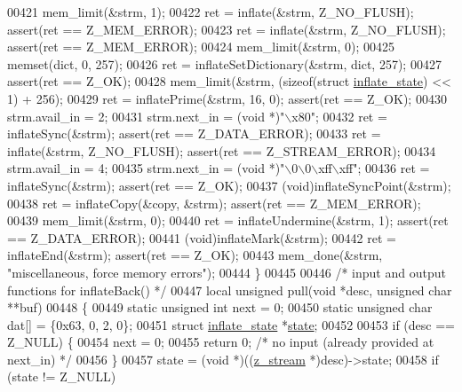 \begin{DoxyCode}
{{{{{00421     mem\_limit(&strm, 1);
00422     ret = inflate(&strm, Z\_NO\_FLUSH);           assert(ret == Z\_MEM\_ERROR);
00423     ret = inflate(&strm, Z\_NO\_FLUSH);           assert(ret == Z\_MEM\_ERROR);
00424     mem\_limit(&strm, 0);
00425     memset(dict, 0, 257);
00426     ret = inflateSetDictionary(&strm, dict, 257);
00427                                                 assert(ret == Z\_OK);
00428     mem\_limit(&strm, (\textcolor{keyword}{sizeof}(\textcolor{keyword}{struct} \hyperlink{structinflate__state}{inflate\_state}) << 1) + 256);
00429     ret = inflatePrime(&strm, 16, 0);           assert(ret == Z\_OK);
00430     strm.avail\_in = 2;
00431     strm.next\_in = (\textcolor{keywordtype}{void} *)\textcolor{stringliteral}{"\(\backslash\)x80"};
00432     ret = inflateSync(&strm);                   assert(ret == Z\_DATA\_ERROR);
00433     ret = inflate(&strm, Z\_NO\_FLUSH);           assert(ret == Z\_STREAM\_ERROR);
00434     strm.avail\_in = 4;
00435     strm.next\_in = (\textcolor{keywordtype}{void} *)\textcolor{stringliteral}{"\(\backslash\)0\(\backslash\)0\(\backslash\)xff\(\backslash\)xff"};
00436     ret = inflateSync(&strm);                   assert(ret == Z\_OK);
00437     (void)inflateSyncPoint(&strm);
00438     ret = inflateCopy(&copy, &strm);            assert(ret == Z\_MEM\_ERROR);
00439     mem\_limit(&strm, 0);
00440     ret = inflateUndermine(&strm, 1);           assert(ret == Z\_DATA\_ERROR);
00441     (void)inflateMark(&strm);
00442     ret = inflateEnd(&strm);                    assert(ret == Z\_OK);
00443     mem\_done(&strm, \textcolor{stringliteral}{"miscellaneous, force memory errors"});
00444 \}
00445 
00446 \textcolor{comment}{/* input and output functions for inflateBack() */}
00447 local \textcolor{keywordtype}{unsigned} pull(\textcolor{keywordtype}{void} *desc, \textcolor{keywordtype}{unsigned} \textcolor{keywordtype}{char} **buf)
00448 \{
00449     \textcolor{keyword}{static} \textcolor{keywordtype}{unsigned} \textcolor{keywordtype}{int} next = 0;
00450     \textcolor{keyword}{static} \textcolor{keywordtype}{unsigned} \textcolor{keywordtype}{char} dat[] = \{0x63, 0, 2, 0\};
00451     \textcolor{keyword}{struct }\hyperlink{structinflate__state}{inflate\_state} *\hyperlink{structstate}{state};
00452 
00453     \textcolor{keywordflow}{if} (desc == Z\_NULL) \{
00454         next = 0;
00455         \textcolor{keywordflow}{return} 0;   \textcolor{comment}{/* no input (already provided at next\_in) */}
00456     \}
00457     state = (\textcolor{keywordtype}{void} *)((\hyperlink{structz__stream__s}{z\_stream} *)desc)->state;
00458     \textcolor{keywordflow}{if} (state != Z\_NULL)
}}}}}
\end{DoxyCode}
